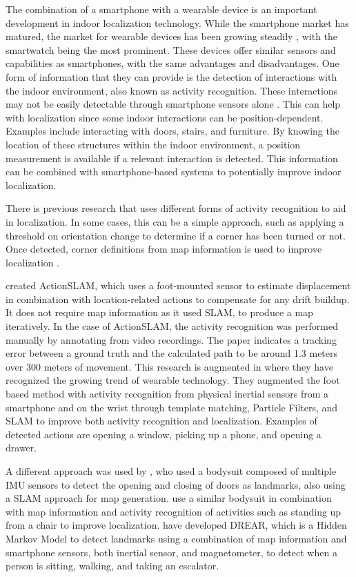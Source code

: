 The combination of a smartphone with a wearable device is an important development in indoor localization technology. While the smartphone market has matured, the market for wearable devices has been growing steadily \cite{jung2016consumer}, with the smartwatch being the most prominent. These devices offer similar sensors and capabilities as smartphones, with the same advantages and disadvantages. One form of information that they can provide is the detection of interactions with the indoor environment, also known as activity recognition. These interactions may not be easily detectable through smartphone sensors alone \cite{Shoaib2015}. This can help with localization since some indoor interactions can be position-dependent. Examples include interacting with doors, stairs, and furniture. By knowing the location of these structures within the indoor environment, a position measurement is available if a relevant interaction is detected. This information can be combined with smartphone-based systems to potentially improve indoor localization.

There is previous research that uses different forms of activity recognition to aid in localization. In some cases, this can be a simple approach, such as applying a threshold on orientation change to determine if a corner has been turned or not. Once detected, corner definitions from map information is used to improve localization \cite{Gu2019,Jackermeier2018}. \par 
\citet{Hardegger2012} created ActionSLAM, which uses a foot-mounted sensor to estimate displacement in combination with location-related actions to compensate for any drift buildup. It does not require map information as it used \ac{SLAM}, to produce a map iteratively. In the case of ActionSLAM, the activity recognition was performed manually by annotating from video recordings. The paper indicates a tracking error between a ground truth and the calculated path to be around 1.3 meters over 300 meters of movement. This research is augmented in \citet{Hardegger2016} where they have recognized the growing trend of wearable technology. They augmented the foot based method with activity recognition from physical inertial sensors from a smartphone and on the wrist through template matching, Particle Filters, and \ac{SLAM} to improve both activity recognition and localization. Examples of detected actions are opening a window, picking up a phone, and opening a drawer. \par
A different approach was used by \citet{Grzonka2010}, who used a bodysuit composed of multiple \ac{IMU} sensors to detect the opening and closing of doors as landmarks, also using a \ac{SLAM} approach for map generation. \citet{Altun2012} use a similar bodysuit in combination with map information and activity recognition of activities such as standing up from a chair to improve localization. \citet{Torok2014} have developed DREAR, which is a Hidden Markov Model to detect landmarks using a combination of map information and smartphone sensors, both inertial sensor, and magnetometer, to detect when a person is sitting, walking, and taking an escalator.

